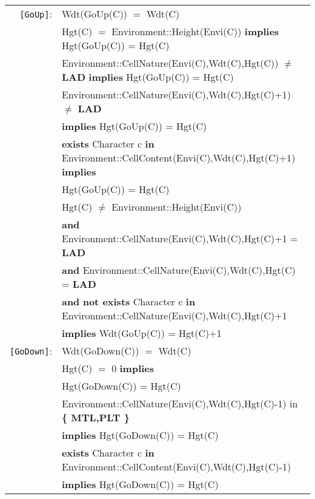 \documentclass{article}
\begin{document}
\begin{tabular}{rl}
\texttt{[GoUp]}: 

& \textrm{Wdt(GoUp(C))} $=$ \textrm{Wdt(C)} \\
& \textrm{Hgt(C)} $=$ \textrm{Environment::Height(Envi(C))} \textbf{implies} \textrm{Hgt(GoUp(C))} = \textrm{Hgt(C)} \\
& \textrm{Environment::CellNature(Envi(C),Wdt(C),Hgt(C))} $\neq$ \textbf{LAD} \textbf{implies} \textrm{Hgt(GoUp(C))} = \textrm{Hgt(C)} \\
& \textrm{Environment::CellNature(Envi(C),Wdt(C),Hgt(C)+1)} $\neq$ \textbf{LAD}\\
& \quad \textbf{implies} \textrm{Hgt(GoUp(C))} = \textrm{Hgt(C)} \\
& \textbf{exists} \textrm{Character} c \textbf{in} \textrm{Environment::CellContent(Envi(C),Wdt(C),Hgt(C)+1)} \textbf{implies}\\
& \quad \textrm{Hgt(GoUp(C))} = \textrm{Hgt(C)} \\

& \textrm{Hgt(C)} $\neq$ \textrm{Environment::Height(Envi(C))} \\
& \quad \textbf{and} \textrm{Environment::CellNature(Envi(C),Wdt(C),Hgt(C)+1} = \textbf{LAD} \\
& \quad \textbf{and} \textrm{Environment::CellNature(Envi(C),Wdt(C),Hgt(C)} = \textbf{LAD} \\
& \quad \textbf{and} \textbf{not exists} \textrm{Character} c \textbf{in} \textrm{Environment::CellNature(Envi(C),Wdt(C),Hgt(C)+1} \\
& \quad \textbf{implies} \textrm{Wdt(GoUp(C))} = \textrm{Hgt(C)}+1 \\

\texttt{[GoDown]}: 

& \textrm{Wdt(GoDown(C))} $=$ \textrm{Wdt(C)} \\

& \textrm{Hgt(C)} $=$ 0 \textbf{implies} \\
& \quad\textrm{Hgt(GoDown(C))} = \textrm{Hgt(C)} \\

& \textrm{Environment::CellNature(Envi(C),Wdt(C),Hgt(C)-1)} \textrm{in} \textbf{ \{ MTL,PLT \} }  \\
& \quad\textbf{implies} \textrm{Hgt(GoDown(C))} = \textrm{Hgt(C)} \\

& \textbf{exists} \textrm{Character} c \textbf{in} \textrm{Environment::CellContent(Envi(C),Wdt(C),Hgt(C)-1)} \\
& \quad \textbf{implies} \textrm{Hgt(GoDown(C))} = \textrm{Hgt(C)} \\


\end{tabular}
\end{document}
